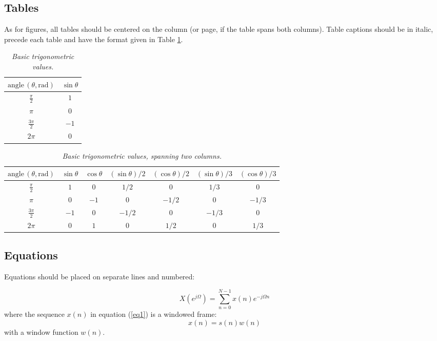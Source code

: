 \documentclass[twoside,a4paper]{article}
\begin{document}
\subsection{Tables}
As for figures, all tables should be centered on the column (or page, if the table spans both columns).
Table captions should be in italic, precede each table and have the format given in Table \ref{tab:example}.

\begin{table}[ht]
  \caption{\itshape Basic trigonometric values.}
	\centering
	\begin{tabular}{|c|c|}
		\hline
		$\mathrm{angle}\,(\theta, \mathrm{rad})$ & $\sin \theta$ \\\hline
		$\frac{\pi}{2}$ & $1$ \\
		$\pi$ & $0$ \\
		$\frac{3\pi}{2}$ & $-1$ \\
		$2\pi$ & $0$ \\\hline
	\end{tabular}
	\label{tab:example}
\end{table}

\begin{table}[ht]
  \caption{{\it Basic trigonometric values, spanning two columns.}}
	\centering
  \begin{tabular}{|c|c|c|c|c|c|c|}\hline
    $\mathrm{angle}\, (\theta, \mathrm{rad})$ & $\sin \theta$ & $\cos \theta $ & $(\sin \theta)/2 $ & $(\cos \theta) /2 $ & $(\sin \theta)/3 $ & $(\cos \theta)/3$    \\\hline
    $\frac{\pi}{2}$ & $1$ & $0$ & $1/2$ & $0$ & $1/3$ & $0$ \\
    $\pi$ & $0$ & $-1$ & $0$ & $-1/2$ & $0$ & $-1/3$\\
    $\frac{3\pi}{2}$ & $-1$ & $0$ & $-1/2$ & $0$ & $-1/3$ & $0$ \\
    $2\pi$ & $0$ & $1$ & $0$ & $1/2$ & $0$ & $1/3$ \\\hline
 \end{tabular}
  \label{tab:example2}
\end{table}

\subsection{Equations}
Equations should be placed on separate lines and numbered:

\begin{equation}
	X(e^{j\Omega})=\sum_{n=0}^{N-1}x(n)e^{-j\Omega n}
	\label{eq1}
	\end{equation}
	where the sequence $x(n)$ in equation (\ref{eq1}) is a windowed frame:
	\begin{equation}
	x(n)=s(n) w(n)
	\label{eq2}
\end{equation}
%
with a window function $w(n)$.
\end{document}
